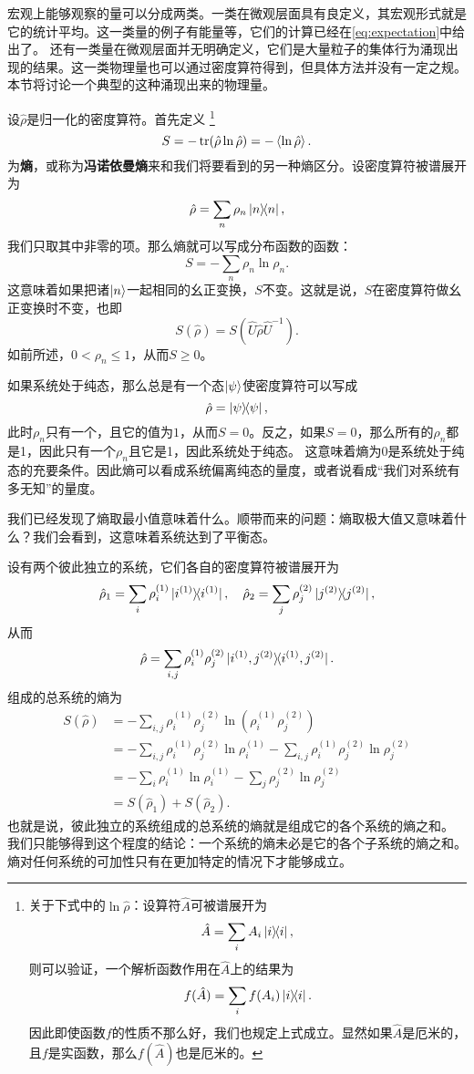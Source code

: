 \documentclass[hyperref, UTF8, a4paper]{ctexart}
\begin{document}
宏观上能够观察的量可以分成两类。一类在微观层面具有良定义，其宏观形式就是它的统计平均。这一类量的例子有能量等，它们的计算已经在\eqref{eq:expectation}中给出了。
还有一类量在微观层面并无明确定义，它们是大量粒子的集体行为涌现出现的结果。这一类物理量也可以通过密度算符得到，但具体方法并没有一定之规。
本节将讨论一个典型的这种涌现出来的物理量。

设$\hat{\rho}$是归一化的密度算符。首先定义%
\footnote{关于下式中的$\ln \hat{\rho}$：设算符$\hat{A}$可被谱展开为
\[
    \hat{A} = \sum_i A_i \dyad{i},
\]
则可以验证，一个解析函数作用在$\hat{A}$上的结果为
\[
    f(\hat{A}) = \sum_i f(A_i) \dyad{i}.
\]
因此即使函数$f$的性质不那么好，我们也规定上式成立。显然如果$\hat{A}$是厄米的，且$f$是实函数，那么$f(\hat{A})$也是厄米的。
}%
\begin{equation}
    S = - \trace (\hat{\rho} \ln \hat{\rho}) = - \expval*{\ln \hat{\rho}}.
    \label{eq:von-neumann-entropy}
\end{equation}
为\textbf{熵}，或称为\textbf{冯诺依曼熵}来和我们将要看到的另一种熵区分。设密度算符被谱展开为
\[
    \hat{\rho} = \sum_n \rho_n \dyad{n},
\]
我们只取其中非零的项。那么熵就可以写成分布函数的函数：
\begin{equation}
    S = - \sum_n \rho_n \ln \rho_n.
\end{equation}
这意味着如果把诸$\ket{n}$一起相同的幺正变换，$S$不变。这就是说，$S$在密度算符做幺正变换时不变，也即
\begin{equation}
    S(\hat{\rho}) = S(\hat{U} \hat{\rho} \hat{U}^{-1}).
\end{equation}
如前所述，$0 < \rho_n \leq 1$，从而$S \geq 0$。

如果系统处于纯态，那么总是有一个态$\ket{\psi}$使密度算符可以写成
\[
    \hat{\rho} = \dyad{\psi},
\]
此时$\rho_n$只有一个，且它的值为$1$，从而$S=0$。反之，如果$S=0$，那么所有的$\rho_n$都是1，因此只有一个$\rho_n$且它是1，因此系统处于纯态。
这意味着熵为$0$是系统处于纯态的充要条件。因此熵可以看成系统偏离纯态的量度，或者说看成“我们对系统有多无知”的量度。

我们已经发现了熵取最小值意味着什么。顺带而来的问题：熵取极大值又意味着什么？我们会看到，这意味着系统达到了平衡态。

设有两个彼此独立的系统，它们各自的密度算符被谱展开为
\[
    \hat{\rho}_1 = \sum_i \rho_i^{(1)} \dyad*{i^{(1)}}, \quad \hat{\rho}_2 = \sum_j \rho_j^{(2)} \dyad*{j^{(2)}},
\]
从而
\[
    \hat{\rho} = \sum_{i,j} \rho_i^{(1)} \rho_j^{(2)} \dyad*{i^{(1)}, j^{(2)}}.
\]
组成的总系统的熵为
\[
    \begin{aligned}
        S(\hat{\rho}) &= - \sum_{i, j} \rho_i^{(1)} \rho_j^{(2)} \ln (\rho_i^{(1)} \rho_j^{(2)}) \\
        &= - \sum_{i, j} \rho_i^{(1)} \rho_j^{(2)} \ln \rho_i^{(1)} - \sum_{i, j} \rho_i^{(1)} \rho_j^{(2)} \ln \rho_j^{(2)} \\
        &= - \sum_i \rho_i^{(1)} \ln \rho_i^{(1)} - \sum_j \rho_j^{(2)} \ln \rho_j^{(2)} \\
        &= S(\hat{\rho}_1) + S(\hat{\rho}_2).
    \end{aligned}
\]
也就是说，彼此独立的系统组成的总系统的熵就是组成它的各个系统的熵之和。
我们只能够得到这个程度的结论：一个系统的熵未必是它的各个子系统的熵之和。
熵对任何系统的可加性只有在更加特定的情况下才能够成立。
\end{document}
